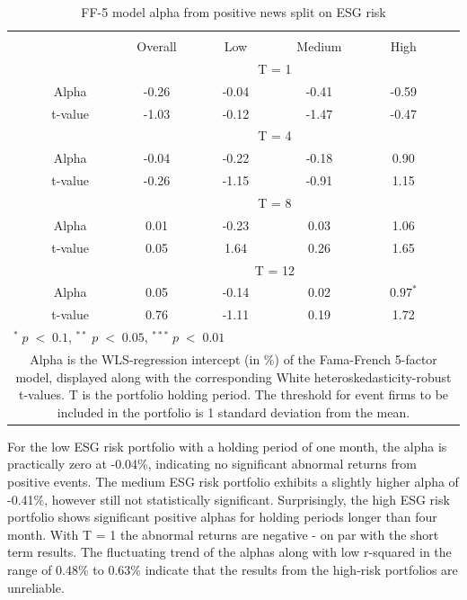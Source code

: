 \setlength{\tabcolsep}{15pt}
\begin{table}[H]
\small
\centering
\caption{FF-5 model alpha from positive news split on ESG risk} 
\begin{tabular}{ccccccc}
\hline \hline \\  
 &     & Overall  &    Low  &  Medium  &  High  &  \\ \cline{3-6} 
& & \multicolumn{4}{c}{ T = 1} & \\ \cline{2-6}
& Alpha   & -0.26 & -0.04  & -0.41  & -0.59 &  \\
& t-value & -1.03 & -0.12 & -1.47  & -0.47 & \\
& &  \multicolumn{4}{c}{ T = 4} & \\ \cline{2-6}
& Alpha   & -0.04 & -0.22  & -0.18  &  0.90 & \\
& t-value & -0.26 & -1.15 & -0.91  & 1.15 & \\
& &  \multicolumn{4}{c}{ T = 8} & \\ \cline{2-6}
& Alpha   & 0.01 & -0.23   & 0.03  & 1.06 &  \\
& t-value & 0.05 & 1.64  & 0.26 & 1.65 & \\
&  &  \multicolumn{4}{c}{ T = 12} & \\ \cline{2-6}
& Alpha   & 0.05 & -0.14  & 0.02  & $0.97^{*}$ &  \\
& t-value & 0.76 & -1.11  & 0.19 & 1.72 & \\
\hline \hline
 \multicolumn{7}{l}{ \footnotesize $^* \; p\; <\; 0.1$, $ ^{**} \; p\; <\; 0.05$, $ ^{***} \; p\; <\; 0.01$  } \\
 \multicolumn{7}{p{12cm}}{ \footnotesize Alpha is the WLS-regression intercept (in \%) of the Fama-French 5-factor model, displayed along with the corresponding White heteroskedasticity-robust t-values. T is the portfolio holding period. The threshold for event firms to be included in the portfolio is 1 standard deviation from the mean.}  \\ 
\end{tabular}
\label{tab: FF5_pos_ESG}
\end{table}

For the low ESG risk portfolio with a holding period of one month, the alpha is practically zero at -0.04\%, indicating no significant abnormal returns from positive events. The medium ESG risk portfolio exhibits a slightly higher alpha of -0.41\%, however still not statistically significant. Surprisingly, the high ESG risk portfolio shows significant positive alphas for holding periods longer than four month. With T = 1 the abnormal returns are negative - on par with the short term results. The fluctuating trend of the alphas along with low r-squared in the range of 0.48\% to 0.63\% indicate that the results from the high-risk portfolios are unreliable. 

